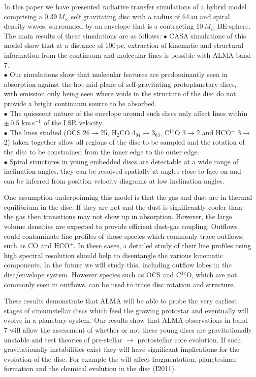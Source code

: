 \documentclass[useAMS,usenatbib]{mn2e}
\begin{document}
In this paper we have presented radiative transfer simulations of a hybrid model comprising a 0.39$\, M_\odot$ self gravitating disc with a radius of 64$\,$au and spiral density waves, surrounded by an envelope that is a contracting 10$\,M_\odot$ BE-sphere. The main results of these simulations are as follows:\newline
$\bullet$ CASA simulations of this model show that at a distance of 100$\,$pc, extraction of kinematic and structural information from the continuum and molecular lines is possible with ALMA band 7.\\
$\bullet$ Our simulations show that molecular features are predominantly seen in absorption against the hot mid-plane of self-gravitating protoplanetary discs, with emission only being seen where voids in the structure of the disc do not provide a bright continuum source to be absorbed.\\
$\bullet$ The quiescent nature of the envelope around such discs only affect lines within $\pm\,$0.5 km$\,$s$^{-1}$ of the LSR velocity.\\
$\bullet$ The lines studied (OCS 26$\rightarrow$25, H$_2$CO 4$_{04}$$\rightarrow$3$_{03}$, C$^{17}$O 3$\rightarrow$2 and HCO$^+$ 3$\rightarrow$2) taken together allow all regions of the disc to be sampled and the rotation of the disc to be constrained from the inner edge to the outer edge.\\
$\bullet$ Spiral structures in young embedded discs are detectable at a wide range of inclination angles, they can be resolved spatially at angles close to face on and can be inferred from position velocity diagrams at low inclination angles.\smallskip


One assumption underpoinning this model is that the gas and dust are in thermal equilibrium in the disc. If they are not and the dust is significantly cooler than the gas then transitions may not show up in absorption. However, the large volume densities are expected to provide efficient dust-gas coupling. Outflows could contaminate line profiles of  those species  which commonly trace outflows, such as CO and HCO$^+$. In these cases, a detailed study of their line profiles using high spectral resolution should help to disentangle the various kinematic components.  In the future we will study this, including outflow lobes in the disc/envelope system.  However species such as OCS and C$^{17}$O, which are not commonly seen in outflows, can be used to trace disc rotation and structure.\smallskip

These results demonstrate that ALMA will be able to probe the very earliest stages of circumstellar discs which feed the growing protostar and eventually will evolve in a planetary system. Our results show that ALMA observations in band 7 will allow the assessment of whether or not these young discs are gravitationally unstable and test theories of pre-stellar $\rightarrow$ protostellar core evolution. If such gravitationally instabilities exist they will have significant implications for the evolution of the disc. For example the will affect fragmentation, planetesimal formation \citep{Boley2009,Johnson2013,Gibbons2012} and the chemical evolution in the disc (I2011). 
\end{document}
